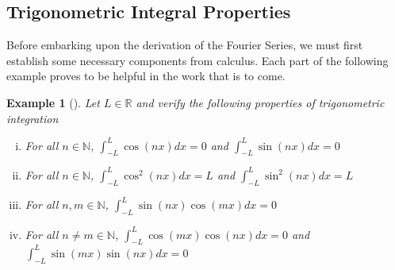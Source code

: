 \documentclass[11pt]{amsart}
\theoremstyle{plain}
\newtheorem{eg}[theorem]{Example}
\theoremstyle{definition}
\newcommand{\N}{\mathbb N}
\newcommand{\R}{\mathbb R}
\begin{document}
\subsection{Trigonometric Integral Properties}
Before embarking upon the derivation of the Fourier Series, we must first establish some necessary components from calculus. Each part of the following example proves to be helpful in the work that is to come. 
\begin{eg}[\cite{Abbott}] \label{trig} %
    Let $L\in\R$ and verify the following properties of trigonometric integration
    \begin{enumerate}[(i)]
        \item For all $n\in \N$, $\int_{-L}^{L} \cos(nx)dx =0$ and $\int_{-L}^{L} \sin(nx)dx =0$ \label{trig1}
        \item For all $n\in \N$, $\int_{-L}^{L} \cos^2(nx)dx = L$ and $\int_{-L}^{L} \sin^2(nx)dx = L$ \label{trig2}
        \item For all $n,m\in \N$, $\int_{-L}^{L} \sin(nx)\cos(mx)dx =0$ \label{trig3}
        \item For all $n\neq m\in \N$, $\int_{-L}^{L} \cos(mx)\cos(nx)dx =0$ and $\int_{-L}^{L} \sin(mx)\sin(nx)dx =0$ \label{trig4}
    \end{enumerate}
\end{eg}
\end{document}
